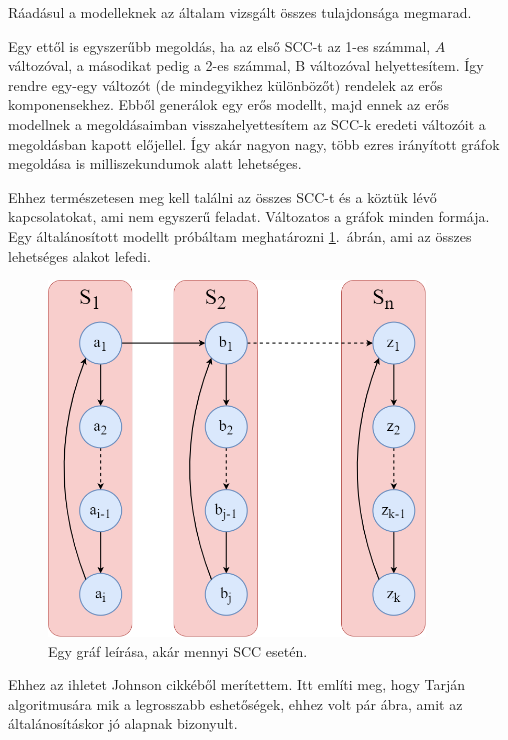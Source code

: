\documentclass[
]{thesis-ekf}
\theoremstyle{definition}
\theoremstyle{remark}
\begin{document}
	Ráadásul a modelleknek az általam vizsgált összes tulajdonsága megmarad.
	
	Egy ettől is egyszerűbb megoldás, ha az első \textsc{SCC}-t az 1-es számmal, $ A $ változóval, a másodikat pedig a 2-es számmal, B változóval helyettesítem. Így rendre egy-egy változót (de mindegyikhez különbözőt) rendelek az erős komponensekhez. Ebből generálok egy erős modellt, majd ennek az erős modellnek a megoldásaimban visszahelyettesítem az \textsc{SCC}-k eredeti változóit a megoldásban kapott előjellel. Így akár nagyon nagy, több ezres irányított gráfok megoldása is milliszekundumok alatt lehetséges.
	\newpage
	
	Ehhez természetesen meg kell találni az összes \textsc{SCC}-t és a köztük lévő kapcsolatokat, ami nem egyszerű feladat. Változatos a gráfok minden formája. Egy általánosított modellt próbáltam meghatározni \ref{abra-sajatpelda-altalanos}.~ábrán, ami az összes lehetséges alakot lefedi.
	
	\begin{figure}[ht]
		\centering
		\includegraphics[width=10cm]{images/sajat_pelda-altalanos}
		\caption{Egy gráf leírása, akár mennyi \textsc{SCC} esetén.}
		\label{abra-sajatpelda-altalanos}
	\end{figure}	

	Ehhez az ihletet Johnson cikkéből \cite{johnson} merítettem. Itt említi meg, hogy Tarján algoritmusára \cite{tarjan} mik a legrosszabb eshetőségek, ehhez volt pár ábra, amit az általánosításkor jó alapnak bizonyult.
\end{document}
